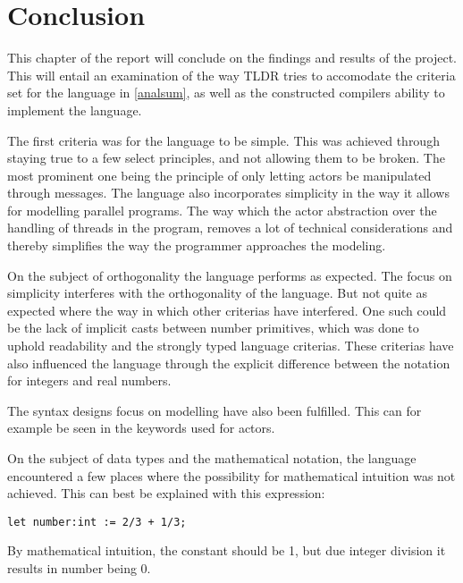 \chapter{Conclusion}

This chapter of the report will conclude on the findings and results of the project. This will entail an examination of the way TLDR tries to accomodate the criteria set for the language in \cref{analsum}, as well as the constructed compilers ability to implement the language.

The first criteria was for the language to be simple. This was achieved through staying true to a few select principles, and not allowing them to be broken. The most prominent one being the principle of only letting actors be manipulated through messages. The language also incorporates simplicity in the way it allows for modelling parallel programs. The way which the actor abstraction over the handling of threads in the program, removes a lot of technical considerations and thereby simplifies the way the programmer approaches the modeling.
 
On the subject of orthogonality the language performs as expected. The focus on simplicity interferes with the orthogonality of the language. But not quite as expected where the way in which other criterias have interfered. One such could be the lack of implicit casts between number primitives, which was done to uphold readability and the strongly typed language criterias. These criterias have also influenced the language through the explicit difference between the notation for integers and real numbers.

The syntax designs focus on modelling have also been fulfilled. This can for example be seen in the keywords used for actors.

On the subject of data types and the mathematical notation, the language encountered a few places where the possibility for mathematical intuition was not achieved. This can best be explained with this expression:

\begin{lstlisting}
let number:int := 2/3 + 1/3;
\end{lstlisting}

By mathematical intuition, the constant should be 1, but due integer division it results in number being 0.







